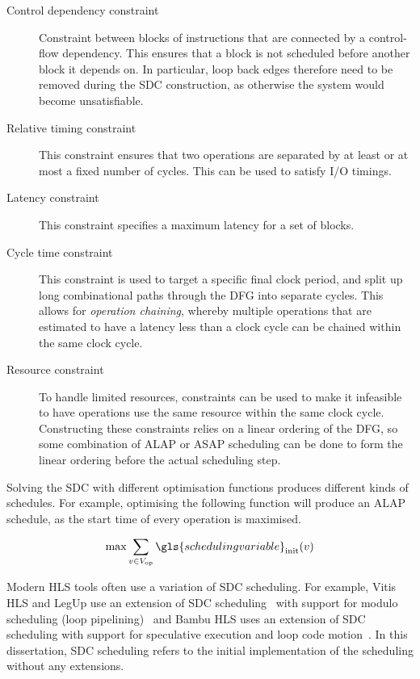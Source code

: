 \begin{description}
\item[Control dependency constraint] Constraint between blocks of instructions
  that are connected by a control-flow dependency.  This ensures that a block is
  not scheduled before another block it depends on.  In particular, loop back
  edges therefore need to be removed during the \gls{SDC} construction, as
  otherwise the system would become unsatisfiable.

\item[Relative timing constraint] This constraint ensures that two operations
  are separated by at least or at most a fixed number of cycles.  This can be
  used to satisfy I/O timings.

\item[Latency constraint] This constraint specifies a maximum latency for a set
  of blocks.

\item[Cycle time constraint] This constraint is used to target a specific final
  clock period, and split up long combinational paths through the \gls{DFG} into
  separate cycles.  This allows for \emph{\gls{operation chaining}}, whereby
  multiple operations that are estimated to have a latency less than a clock
  cycle can be chained within the same clock cycle.

\item[Resource constraint] To handle limited resources, constraints can be used
  to make it infeasible to have operations use the same resource within the same
  clock cycle.  Constructing these constraints relies on a linear ordering of
  the \gls{DFG}, so some combination of \gls{ALAP} or \gls{ASAP} scheduling can
  be done to form the linear ordering before the actual scheduling step.
\end{description}

Solving the \gls{SDC} with different optimisation functions produces different
kinds of schedules.  For example, optimising the following function will produce
an \gls{ALAP} schedule, as the start time of every operation is maximised.

\begin{equation*}
  \mathrm{max} \sum_{v \in V_{\mathrm{op}}} \gls{scheduling variable}_{\mathrm{init}}(v)
\end{equation*}

Modern \gls{HLS} tools often use a variation of \gls{SDC} scheduling.  For
example, Vitis HLS and LegUp use an extension of \gls{SDC}
scheduling~\cite[]{zhang13_sdc,canis14_modul_sdc} with support for modulo
scheduling (loop pipelining)~\cite[]{rau96_iterat_modul_sched} and Bambu HLS
uses an extension of \gls{SDC} scheduling with support for speculative execution
and loop code motion~\cite[]{lattuada15_ctbsss}.  In this dissertation,
\gls{SDC} scheduling refers to the initial implementation of the scheduling
without any extensions.

